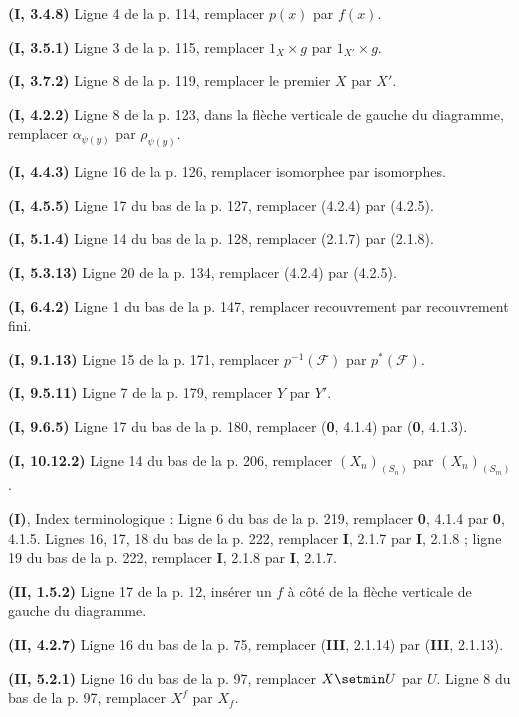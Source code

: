 \noindent\textbf{(I, 3.4.8)} Ligne 4 de la p. 114, remplacer $p(x)$ par
$f(x)$.

\noindent\textbf{(I, 3.5.1)} Ligne 3 de la p. 115, remplacer $1_X\times g$
par $1_{X'}\times g$.

\noindent\textbf{(I, 3.7.2)} Ligne 8 de la p. 119, remplacer le premier $X$
par $X'$.

\noindent\textbf{(I, 4.2.2)} Ligne 8 de la p. 123, dans la flèche verticale de
gauche du diagramme, remplacer $\alpha_{\psi(y)}$ par $\rho_{\psi(y)}$.

\noindent\textbf{(I, 4.4.3)} Ligne 16 de la p. 126, remplacer isomorphee par
isomorphes.

\noindent\textbf{(I, 4.5.5)} Ligne 17 du bas de la p. 127, remplacer (4.2.4)
par (4.2.5).

\noindent\textbf{(I, 5.1.4)} Ligne 14 du bas de la p. 128, remplacer (2.1.7)
par (2.1.8).

\noindent\textbf{(I, 5.3.13)} Ligne 20 de la p. 134, remplacer (4.2.4) par
(4.2.5).

\noindent\textbf{(I, 6.4.2)} Ligne 1 du bas de la p. 147, remplacer
recouvrement par recouvrement fini.

\noindent\textbf{(I, 9.1.13)} Ligne 15 de la p. 171, remplacer
$p^{-1}(\mathscr F)$ par $p^*(\mathscr F)$.

\noindent\textbf{(I, 9.5.11)} Ligne 7 de la p. 179, remplacer $Y$ par $Y'$.

\noindent\textbf{(I, 9.6.5)} Ligne 17 du bas de la p. 180, remplacer
(\textbf{0}, 4.1.4) par (\textbf{0}, 4.1.3).

\noindent\textbf{(I, 10.12.2)} Ligne 14 du bas de la p. 206, remplacer
$(X_n)_{(S_n)}$ par $(X_n)_{(S_m)}$.

\clearpage
{}
\noindent\textbf{(I)}, Index terminologique : Ligne 6 du bas de la p. 219,
remplacer \textbf{0}, 4.1.4 par \textbf{0}, 4.1.5. Lignes 16, 17, 18 du bas de la p. 222,
remplacer \textbf{I}, 2.1.7 par \textbf{I}, 2.1.8 ; ligne 19 du bas de la p. 222, remplacer \textbf{I},
2.1.8 par \textbf{I}, 2.1.7.

\noindent\textbf{(II, 1.5.2)} Ligne 17 de la p. 12, insérer un $f$ à côté de
la flèche verticale de gauche du diagramme.

\noindent\textbf{(II, 4.2.7)} Ligne 16 du bas de la p. 75, remplacer (\textbf{III},
2.1.14) par (\textbf{III}, 2.1.13).

\noindent\textbf{(II, 5.2.1)} Ligne 16 du bas de la p. 97, remplacer $X\setmin U$ par
$U$. Ligne 8 du bas de la p. 97, remplacer $X^f$ par $X_f$.

